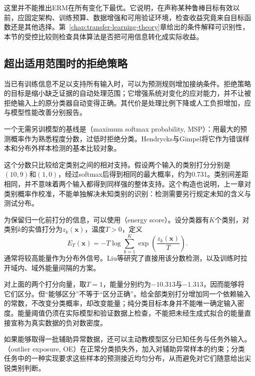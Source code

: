 这里并不能推出ERM在所有变化下最优。它说明，在声称某种鲁棒目标有效以前，应固定架构、训练预算、数据增强和可用验证环境，检查收益究竟来自目标函数还是其他选择。第~\ref{chap:transfer-learning-theory}章给出的条件解释可识别性，本节的受控比较则检查具体算法是否把可用信息转化成实际收益。

\subsection{超出适用范围时的拒绝策略}
\label{sec:robustness-rejection}

当已有训练信息不足以支持所有输入时，可以为预测规则增加接纳条件。拒绝策略的目标是缩小缺乏证据的自动处理范围；它增强系统对变化的应对能力，并不让被拒绝输入上的原分类器自动变得正确。其代价是处理比例下降或人工负担增加，应与模型性能改善分别报告。

一个无需另训模型的基线是（maximum softmax probability, MSP）：用最大的预测概率作为熟悉程度分数，过低时拒绝分类。Hendrycks与Gimpel将它作为错误样本和分布外样本检测的基本比较对象。

这个分数只比较给定类别之间的相对支持。假设两个输入的类别打分分别是$(10,9)$和$(1,0)$，经过softmax后得到相同的最大概率，约为0.731。类别间差距相同，并不意味着两个输入都得到同样强的整体支持。这个构造也说明，上一章对类别概率作校准，不能单独解决未知类别的识别：检测需要另行规定未知的含义与测试分布。

为保留归一化前打分的信息，可以使用（energy score）。设分类器有$K$个类别，对类别$k$的实值打分为$z_k(\bm{x})$，温度$T>0$，定义
\begin{equation}
 E_T(\bm{x})=-T\log\sum_{k=1}^{K}
       \exp\!\left(\frac{z_k(\bm{x})}{T}\right).
 \label{eq:robustness-energy}
\end{equation}
通常将较高能量作为分布外信号。Liu等研究了直接用该分数检测，以及训练时拉开域内、域外能量间隔的方案。

对上面的两个打分向量，取$T=1$，能量分别约为$-10.313$与$-1.313$，因而能够将它们区分。但“能够区分”不等于“区分正确”。给全部类别打分增加同一个依赖输入的常数，不改变分类概率，却改变能量；纯分类目标本身并不能唯一确定输入密度。能量阈值仍须在实际模型和验证数据上检查，不能把未经生成式拟合的能量直接宣称为真实数据的负对数密度。

如果能够取得一批辅助异常数据，还可以主动教模型区分已知任务与任务外输入。（outlier exposure, OE）在正常分类损失外，加入对辅助异常样本的约束；分类任务中的一种实现要求这些样本的预测接近均匀分布，从而避免对它们随意给出尖锐类别判断。

